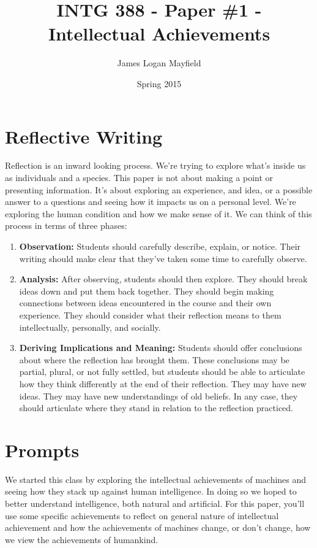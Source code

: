 \documentclass[]{tufte-handout}
\title{INTG 388 - Paper \#1 - Intellectual Achievements}
\author{James Logan Mayfield }
\date{ Spring 2015 }
\begin{document}
\maketitle

\section{Reflective Writing}

Reflection is an inward looking process. We're trying to explore what's inside us as individuals and a species. This paper is not about making a point or presenting information. It's about exploring an experience, and idea, or a possible answer to a questions and seeing how it impacts us on a personal level. We're exploring the human condition and how we make sense of it. We can think of this process in terms of three phases:
\begin{enumerate}
\item \textbf{Observation:} Students should carefully describe, explain, or notice. Their writing should make clear that they've taken some time to carefully observe. \newline
\item \textbf{Analysis:} After observing, students should then explore. They should break ideas down and put them back together. They should begin making connections between ideas encountered in the course and their own experience. They should consider what their reflection means to them intellectually, personally, and socially. \newline
\item \textbf{Deriving Implications and Meaning:} Students should offer conclusions about where the reflection has brought them. These conclusions may be partial, plural, or not fully settled, but students should be able to articulate how they think differently at the end of their reflection. They may have new ideas. They may have new understandings of old beliefs. In any case, they should articulate where they stand in relation to the reflection practiced. 
\end{enumerate}

\section{Prompts}

We started this class by exploring the intellectual achievements of machines and seeing how they stack up against human intelligence.  In doing so we hoped to better understand intelligence, both natural and artificial. For this paper, you'll use some specific achievements to reflect on general nature of intellectual achievement and how the achievements of machines change, or don't change, how we view the achievements of humankind. 
\end{document}
